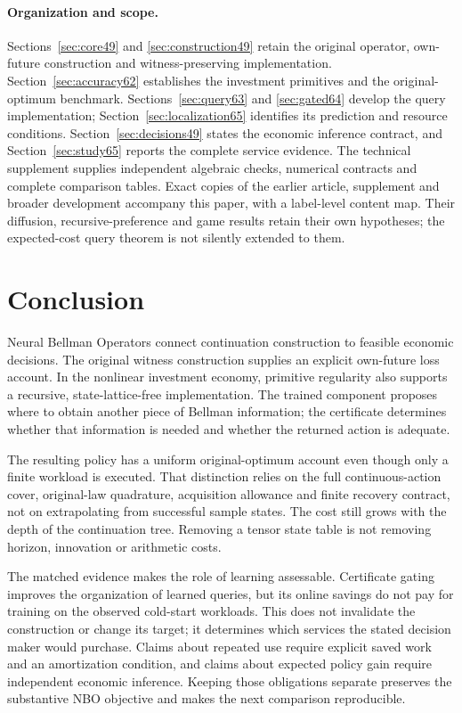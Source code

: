 \documentclass[ecta,nameyear,draft]{econsocart}
\begin{document}
\paragraph{Organization and scope.}
Sections~\ref{sec:core49} and \ref{sec:construction49} retain the original operator, own-future construction and witness-preserving implementation. Section~\ref{sec:accuracy62} establishes the investment primitives and the original-optimum benchmark. Sections~\ref{sec:query63} and \ref{sec:gated64} develop the query implementation; Section~\ref{sec:localization65} identifies its prediction and resource conditions. Section~\ref{sec:decisions49} states the economic inference contract, and Section~\ref{sec:study65} reports the complete service evidence. The technical supplement supplies independent algebraic checks, numerical contracts and complete comparison tables. Exact copies of the earlier article, supplement and broader development accompany this paper, with a label-level content map. Their diffusion, recursive-preference and game results retain their own hypotheses; the expected-cost query theorem is not silently extended to them.









\section{Conclusion}\label{sec:conclusion65}
Neural Bellman Operators connect continuation construction to feasible economic decisions. The original witness construction supplies an explicit own-future loss account. In the nonlinear investment economy, primitive regularity also supports a recursive, state-lattice-free implementation. The trained component proposes where to obtain another piece of Bellman information; the certificate determines whether that information is needed and whether the returned action is adequate.

The resulting policy has a uniform original-optimum account even though only a finite workload is executed. That distinction relies on the full continuous-action cover, original-law quadrature, acquisition allowance and finite recovery contract, not on extrapolating from successful sample states. The cost still grows with the depth of the continuation tree. Removing a tensor state table is not removing horizon, innovation or arithmetic costs.

The matched evidence makes the role of learning assessable. Certificate gating improves the organization of learned queries, but its online savings do not pay for training on the observed cold-start workloads. This does not invalidate the construction or change its target; it determines which services the stated decision maker would purchase. Claims about repeated use require explicit saved work and an amortization condition, and claims about expected policy gain require independent economic inference. Keeping those obligations separate preserves the substantive NBO objective and makes the next comparison reproducible.


\end{document}
